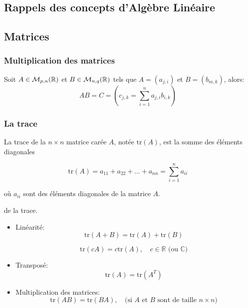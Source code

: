 \begin{appendices}
    \chapter{Rappels des concepts d'Algèbre Linéaire} 
    \section{Matrices}
    \subsection{Multiplication des matrices}
    \begin{definition}
        Soit $A \in \mathcal{M}_{p, n}(\mathbb{R})$ et $B \in \mathcal{M}_{n, q}(\mathbb{R})$ tels que $A = (a_{j, i})$ et $B = (b_{m, k})$, alors:
         \[
        AB = C = (c_{j, k} = \sum_{i=1}^{n} a_{j, i}b_{i, k})
        \] 
    \end{definition}
    \subsection{La trace}
    \begin{definition}
        La trace de la \( n \times n \) matrice carée \( A \), notée \( \text{tr}(A) \), est la somme des éléments diagonales

        \[
            \text{tr}(A) = a_{11} + a_{22} + \dots + a_{nn} = \sum_{i=1}^{n} a_{ii}
        \]

        où \( a_{ii} \) sont des éléments diagonales de la matrice \( A \). 
    \end{definition}

    \begin{property} de la trace.
       \begin{itemize}
           \item Linéarité:
               \[
                   \text{tr}(A + B) = \text{tr}(A) + \text{tr}(B)
               \]

               \[
                   \text{tr}(cA) = c \text{tr}(A), \quad c \in \mathbb{R} \text{ (ou } \mathbb{C} \text{)}
               \]
            \item  Transposé:
                \[
                    \text{tr}(A) = \text{tr}(A^T)
                \] 
            \item Multiplication des matrices:
                \[
                    \text{tr}(AB) = \text{tr}(BA), \quad \text{(si } A \text{ et } B \text{ sont de taille } n \times n)
                \]


\end{itemize}
\end{property}
\end{appendices}
